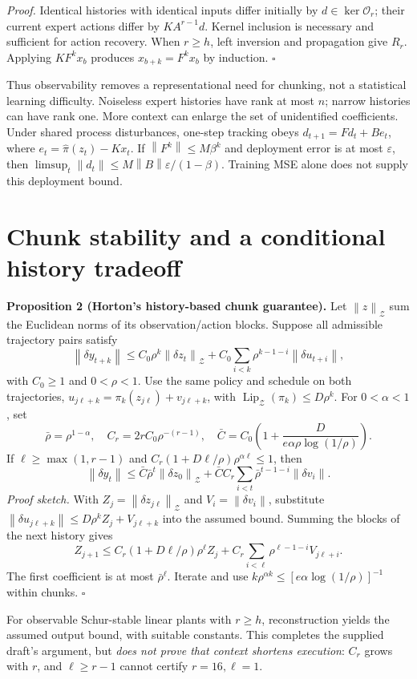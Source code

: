 \documentclass[11pt]{article}
\newcommand{\norm}[1]{\left\lVert#1\right\rVert}
\begin{document}
\emph{Proof.} Identical histories with identical inputs differ initially by $d\in\ker\mathcal O_r$; their current expert actions differ by $KA^{r-1}d$. Kernel inclusion is necessary and sufficient for action recovery. When $r\ge h$, left inversion and propagation give $R_r$. Applying $KF^kx_b$ produces $x_{b+k}=F^kx_b$ by induction. $\square$

Thus observability removes a representational need for chunking, not a statistical learning difficulty. Noiseless expert histories have rank at most $n$; narrow histories can have rank one. More context can enlarge the set of unidentified coefficients. Under shared process disturbances, one-step tracking obeys $d_{t+1}=Fd_t+Be_t$, where $e_t=\hat\pi(z_t)-Kx_t$. If $\norm{F^k}\le M\beta^k$ and deployment error is at most $\varepsilon$, then
$\limsup_t\norm{d_t}\le M\norm{B}\varepsilon/(1-\beta)$.
Training MSE alone does not supply this deployment bound.

\newpage
\section{Chunk stability and a conditional history tradeoff}
\noindent\textbf{Proposition 2 (Horton's history-based chunk guarantee).}
Let $\norm{z}_{\mathcal Z}$ sum the Euclidean norms of its observation/action blocks. Suppose all admissible trajectory pairs satisfy
\[
\norm{\delta y_{t+k}}\le C_0\rho^k\norm{\delta z_t}_{\mathcal Z}
+C_0\sum_{i<k}\rho^{k-1-i}\norm{\delta u_{t+i}},
\]
with $C_0\ge1$ and $0<\rho<1$. Use the same policy and schedule on both trajectories, $u_{j\ell+k}=\pi_k(z_{j\ell})+v_{j\ell+k}$, with
$\operatorname{Lip}_{\mathcal Z}(\pi_k)\le D\rho^k$. For $0<\alpha<1$, set
\[
\bar\rho=\rho^{1-\alpha},\quad C_r=2rC_0\rho^{-(r-1)},\quad
\bar C=C_0\left(1+\frac{D}{e\alpha\rho\log(1/\rho)}\right).
\]
If $\ell\ge\max(1,r-1)$ and $C_r(1+D\ell/\rho)\rho^{\alpha\ell}\le1$, then
\[
\norm{\delta y_t}\le\bar C\bar\rho^t\norm{\delta z_0}_{\mathcal Z}
+\bar CC_r\sum_{i<t}\bar\rho^{t-1-i}\norm{\delta v_i}.
\]
\emph{Proof sketch.} With $Z_j=\norm{\delta z_{j\ell}}_{\mathcal Z}$ and $V_i=\norm{\delta v_i}$, substitute
$\norm{\delta u_{j\ell+k}}\le D\rho^kZ_j+V_{j\ell+k}$ into the assumed bound. Summing the blocks of the next history gives
\[
Z_{j+1}\le C_r(1+D\ell/\rho)\rho^\ell Z_j
+C_r\sum_{i<\ell}\rho^{\ell-1-i}V_{j\ell+i}.
\]
The first coefficient is at most $\bar\rho^\ell$. Iterate and use
$k\rho^{\alpha k}\le[e\alpha\log(1/\rho)]^{-1}$ within chunks. $\square$

For observable Schur-stable linear plants with $r\ge h$, reconstruction yields the assumed output bound, with suitable constants. This completes the supplied draft's argument, but \emph{does not prove that context shortens execution}: $C_r$ grows with $r$, and $\ell\ge r-1$ cannot certify $r=16,\ell=1$.
\end{document}
